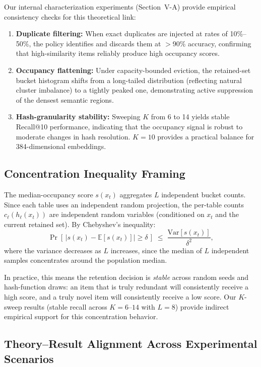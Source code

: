 \documentclass[conference]{IEEEtran}
\begin{document}
Our internal characterization experiments (Section~V-A) provide
empirical consistency checks for this theoretical link:
\begin{enumerate}
\item \textbf{Duplicate filtering:} When exact duplicates are injected
      at rates of 10\%--50\%, the policy identifies and discards them at
      $>$90\% accuracy, confirming that high-similarity items reliably
      produce high occupancy scores.
\item \textbf{Occupancy flattening:} Under capacity-bounded eviction,
      the retained-set bucket histogram shifts from a long-tailed
      distribution (reflecting natural cluster imbalance) to a tightly
      peaked one, demonstrating active suppression of the densest
      semantic regions.
\item \textbf{Hash-granularity stability:} Sweeping $K$ from 6 to 14
      yields stable Recall@10 performance, indicating that the
      occupancy signal is robust to moderate changes in hash resolution.
      $K{=}10$ provides a practical balance for 384-dimensional
      embeddings.
\end{enumerate}

\subsection{Concentration Inequality Framing}
\label{sec:concentration}
The median-occupancy score $s(x_t)$ aggregates $L$ independent bucket
counts. Since each table uses an independent random projection, the
per-table counts $c_\ell(h_\ell(x_t))$ are independent random variables
(conditioned on $x_t$ and the current retained set). By Chebyshev's
inequality:
\begin{equation}
\Pr\!\left[\,|s(x_t) - \mathbb{E}[s(x_t)]| \ge \delta\,\right]
\;\le\; \frac{\mathrm{Var}[s(x_t)]}{\delta^2},
\label{eq:chebyshev}
\end{equation}
where the variance decreases as $L$ increases, since the median of $L$
independent samples concentrates around the population median.

In practice, this means the retention decision is \emph{stable} across
random seeds and hash-function draws: an item that is truly redundant
will consistently receive a high score, and a truly novel item will
consistently receive a low score. Our $K$-sweep results (stable recall
across $K{=}6$--$14$ with $L{=}8$) provide indirect empirical support for
this concentration behavior.

\subsection{Theory--Result Alignment Across Experimental Scenarios}
\label{sec:alignment}
\end{document}
